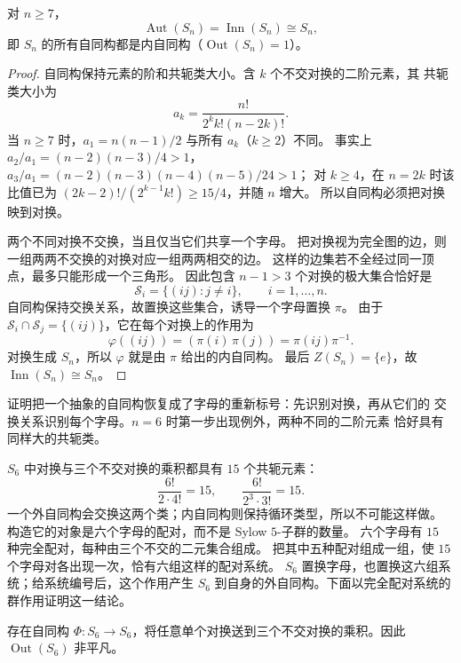\begin{theorem}[对称群的自同构群]
\label{thm:symmetric-aut}
对 $n\geqslant7$，
\[
\operatorname{Aut}(S_n)=\operatorname{Inn}(S_n)\cong S_n,
\]
即 $S_n$ 的所有自同构都是内自同构（$\operatorname{Out}(S_n)=1$）。
\end{theorem}

\begin{proof}
自同构保持元素的阶和共轭类大小。含 $k$ 个不交对换的二阶元素，其
共轭类大小为
\[
a_k=\frac{n!}{2^k k!(n-2k)!}.
\]
当 $n\ge7$ 时，$a_1=n(n-1)/2$ 与所有 $a_k$（$k\ge2$）不同。
事实上 $a_2/a_1=(n-2)(n-3)/4>1$，
$a_3/a_1=(n-2)(n-3)(n-4)(n-5)/24>1$；
对 $k\ge4$，在 $n=2k$ 时该比值已为
$(2k-2)!/(2^{k-1}k!)\ge15/4$，并随 $n$ 增大。
所以自同构必须把对换映到对换。

两个不同对换不交换，当且仅当它们共享一个字母。
把对换视为完全图的边，则一组两两不交换的对换对应一组两两相交的边。
这样的边集若不全经过同一顶点，最多只能形成一个三角形。
因此包含 $n-1>3$ 个对换的极大集合恰好是
\[
\mathcal S_i=\{(ij):j\ne i\},\qquad i=1,\dots,n.
\]
自同构保持交换关系，故置换这些集合，诱导一个字母置换 $\pi$。
由于 $\mathcal S_i\cap\mathcal S_j=\{(ij)\}$，它在每个对换上的作用为
\[
\varphi((ij))=(\pi(i)\,\pi(j))=\pi(ij)\pi^{-1}.
\]
对换生成 $S_n$，所以 $\varphi$ 就是由 $\pi$ 给出的内自同构。
最后 $Z(S_n)=\{e\}$，故 $\operatorname{Inn}(S_n)\cong S_n$。
\end{proof}

证明把一个抽象的自同构恢复成了字母的重新标号：先识别对换，再从它们的
交换关系识别每个字母。$n=6$ 时第一步出现例外，两种不同的二阶元素
恰好具有同样大的共轭类。

\begin{note}[{$S_6$ 的外自同构}]
$S_6$ 中对换与三个不交对换的乘积都具有 $15$ 个共轭元素：
\[
\frac{6!}{2\cdot4!}=15,
\qquad \frac{6!}{2^3\cdot3!}=15.
\]
一个外自同构会交换这两个类；内自同构则保持循环类型，所以不可能这样做。
构造它的对象是六个字母的配对，而不是 Sylow $5$-子群的数量。
六个字母有 $15$ 种完全配对，每种由三个不交的二元集合组成。
把其中五种配对组成一组，使 $15$ 个字母对各出现一次，恰有六组这样的配对系统。
$S_6$ 置换字母，也置换这六组系统；给系统编号后，这个作用产生
$S_6$ 到自身的外自同构。下面以完全配对系统的群作用证明这一结论。
\end{note}

\begin{theorem}[$S_6$ 的外自同构存在性]
存在自同构 $\Phi:S_6\to S_6$，将任意单个对换送到三个不交对换的乘积。因此 $\operatorname{Out}(S_6)$ 非平凡。
\end{theorem}

